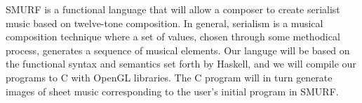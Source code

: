 SMURF is a functional language that will allow a composer to create serialist music
based on twelve-tone composition. In general, serialism is a musical composition
technique where a set of values, chosen through some methodical process, generates
a sequence of musical elements. Our languge will be based on the functional syntax
and semantics set forth by Haskell, and we will compile our programs to C with OpenGL
libraries. The C program will in turn generate images of sheet music corresponding to the user's
initial program in SMURF.
